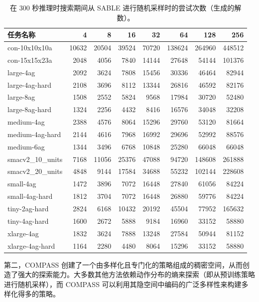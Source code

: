 \documentclass[11pt,UTF8,fontset=fandol]{ctexart}
\begin{document}
\begin{table}[H]\centering
\caption{在 300 秒推理时搜索期间从 SABLE 进行随机采样时的尝试次数（生成的解数）。}
\label{tab:13}
\small
\begin{tabular}{lrrrrrrr}
\toprule
任务名称 & 4 & 8 & 16 & 32 & 64 & 128 & 256\\
\midrule
con-10x10x10a & 10632 & 20504 & 39524 & 70720 & 138624 & 264960 & 448512\\
con-15x15x23a & 2048 & 4056 & 7840 & 14144 & 27648 & 54144 & 101376\\
large-4ag & 2092 & 3624 & 7808 & 15456 & 30336 & 46464 & 82944\\
large-4ag-hard & 2108 & 3696 & 8112 & 13344 & 26816 & 46592 & 82176\\
large-8ag & 1508 & 2552 & 5824 & 9568 & 17984 & 30720 & 52480\\
large-8ag-hard & 1324 & 2256 & 4432 & 8416 & 16576 & 34048 & 32208\\
medium-4ag & 2388 & 4576 & 8064 & 15296 & 29760 & 53120 & 81664\\
medium-4ag-hard & 2144 & 4616 & 7968 & 16992 & 29696 & 52992 & 88576\\
medium-6ag & 1344 & 3496 & 6768 & 10848 & 25280 & 66048 & 66048\\
smacv2\_10\_units & 7168 & 11056 & 25376 & 47088 & 94720 & 148608 & 261888\\
smacv2\_20\_units & 4848 & 9144 & 17584 & 34688 & 55232 & 102144 & 228608\\
small-4ag & 1472 & 3896 & 7072 & 16448 & 27840 & 61056 & 84224\\
small-4ag-hard & 1812 & 3704 & 7072 & 16448 & 26880 & 59776 & 84224\\
tiny-2ag-hard & 2824 & 6168 & 10432 & 20192 & 45504 & 77952 & 165632\\
tiny-4ag-hard & 1600 & 2672 & 5888 & 9184 & 16960 & 33152 & 58880\\
xlarge-4ag & 1832 & 3624 & 7888 & 13248 & 27584 & 50944 & 81152\\
xlarge-4ag-hard & 1164 & 2280 & 4480 & 8064 & 15296 & 33152 & 58880\\
\bottomrule
\end{tabular}
\end{table}

第二，COMPASS 创建了一个由多样化且专门化的策略组成的稠密空间，从而创造了强大的探索能力。大多数其他方法依赖动作分布的熵来探索（即从预训练策略进行随机采样），而 COMPASS 可以利用其隐空间中编码的广泛多样性来构建多样化得多的策略。
\end{document}
